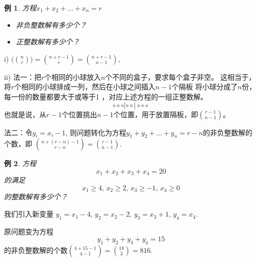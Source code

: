 \documentclass[13pt, punct]{ctexbeamer}
\newtheorem{ex}{例}[section]
\begin{document}
\begin{frame}
	\begin{ex}
		方程$x_1+x_2+\dots +x_n=r$
		\begin{itemize}
			\item[i)]	非负整数解有多少个？

			\item[ii)] 	正整数解有多少个？
		\end{itemize}
	\end{ex}
	\pause

	i) $\big(\!{n\choose r}\!\big)={n+r-1\choose r}={n+r-1\choose n-1}$,

	ii) 法一：把$r$个相同的小球放入$n$个不同的盒子，要求每个盒子非空。
	这相当于，将$r$个相同的小球排成一列，然后在小球之间插入$n-1$个隔板  将小球分成了$n$份，每一份的数量都要大于或等于1 ，对应上述方程的一组正整数解。
	{\Large $$\circ \circ \circ |  \circ  \circ | \circ \circ \circ$$}
	也就是说，从$r-1$个位置挑出$n-1$个位置，用于放置隔板，即${r-1 \choose n-1}$。

	\quad 法二：令$y_i=x_i-1$, 则问题转化为方程$y_1+y_2+\dots +y_n=r-n$的非负整数解的个数，即 ${n+(r-n)-1 \choose r-n} = {r-1 \choose n-1}$.

\end{frame}




\begin{frame}
\begin{ex}
方程$$x_1+x_2+x_3+x_4=20$$的满足$$x_1\ge 4,  \,   x_2\ge 2,   \,  x_3\ge -1,  \,   x_4\ge 0$$的整数解有多少个？
\end{ex}
\pause
我们引入新变量
$y_1 = x_1-4,  \,  y_2 = x_2-2, \,  y_3 = x_3+1,  \,  y_4 = x_4$.

原问题变为方程
$$y_1 +y_2 +y_3 +y_4 = 15$$
的非负整数解的个数${4+15 -1 \choose 4-1}= {18 \choose 3}=816$.
\end{frame}
\end{document}
